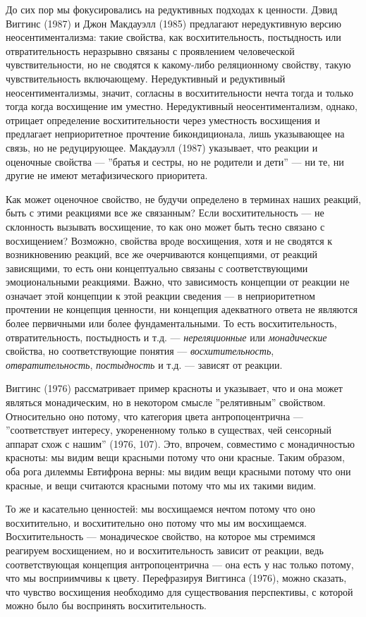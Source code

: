 \documentclass[11pt]{book}
\begin{document}
До сих пор мы фокусировались на редуктивных подходах к ценности. Дэвид Виггинс (1987) и Джон Макдауэлл (1985) предлагают нередуктивную версию неосентиментализма: такие свойства, как восхитительность, постыдность или отвратительность неразрывно связаны с проявлением человеческой чувствительности, но не сводятся к какому-либо реляционному свойству, такую чувствительность включающему. Нередуктивный и редуктивный неосентиментализмы, значит, согласны в восхитительности нечта тогда и только тогда когда восхищение им уместно. Нередуктивный неосентиментализм, однако, отрицает определение восхитительности через уместность восхищения и предлагает неприоритетное прочтение бикондиционала, лишь указывающее на связь, но не редуцирующее. Макдауэлл (1987) указывает, что реакции и оценочные свойства --- ''братья и сестры, но не родители и дети'' --- ни те, ни другие не имеют метафизического приоритета.

Как может оценочное свойство, не будучи определено в терминах наших реакций, быть с этими реакциями все же связанным? Если восхитительность --- не склонность вызывать восхищение, то как оно может быть тесно связано с восхищением? Возможно, свойства вроде восхищения, хотя и не сводятся к возникновению реакций, все же очерчиваются концепциями, от реакций зависящими, то есть они концептуально связаны с соответствующими эмоциональными реакциями. Важно, что зависимость концепции от реакции не означает этой концепции к этой реакции сведения --- в неприоритетном прочтении не концепция ценности, ни концепция адекватного ответа не являются более первичными или более фундаментальными. То есть восхитительность, отвратительность, постыдность и т.д. --- \textit{нереляционные} или \textit{монадические} свойства, но соответствующие понятия --- \textit{восхитительность}, \textit{отвратительность}, \textit{постыдность} и т.д. --- зависят от реакции.

Виггинс (1976) рассматривает пример красноты и указывает, что и она может являться монадическим, но в некотором смысле ''релятивным'' свойством. Относительно оно потому, что категория цвета антропоцентрична --- ''соответствует интересу, укорененному только в существах, чей сенсорный аппарат схож с нашим'' (1976, 107). Это, впрочем, совместимо с монадичностью красноты: мы видим вещи красными потому что они красные. Таким образом, оба рога дилеммы Евтифрона верны: мы видим вещи красными потому что они красные, и вещи считаются красными потому что мы их такими видим.

То же и касательно ценностей: мы восхищаемся нечтом потому что оно восхитительно, и восхитительно оно потому что мы им восхищаемся. Восхитительность --- монадическое свойство, на которое мы стремимся реагируем восхищением, но и восхитительность зависит от реакции, ведь соответствующая концепция антропоцентрична --- она есть у нас только потому, что мы восприимчивы к цвету. Перефразируя Виггинса (1976), можно сказать, что чувство восхищения необходимо для существования перспективы, с которой можно было бы воспринять восхитительность.
\end{document}
